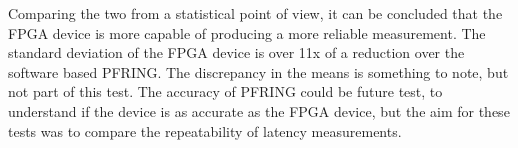 Comparing the two from a statistical point of view, it can be concluded that the FPGA device is more capable of 
producing a more reliable measurement. The standard deviation of the FPGA device is over 11x of a reduction over the 
software based PF\textunderscore RING. The discrepancy in the means is something to note, but not part of this test. 
The accuracy of PF\textunderscore RING could be future test, to understand if the device is as accurate as the FPGA 
device, but the aim for these tests was to compare the repeatability of latency measurements. 
